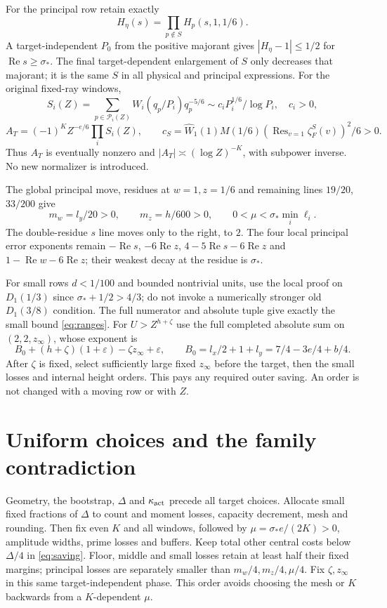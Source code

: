 \documentclass[11pt,a4paper]{article}
\theoremstyle{definition}
\newcommand{\Rea}{\operatorname{Re}}
\newcommand{\eps}{\varepsilon}
\newcommand{\sig}{\sigma_*}
\begin{document}
For the principal row retain exactly
\[
 H_\eta(s)=\prod_{p\notin S}H_p(s,1,1/6).
\]
A target-independent $P_0$ from the positive majorant gives
$|H_\eta-1|\le1/2$ for $\Rea s\ge\sig$.
The final target-dependent enlargement of $S$ only decreases
that majorant; it is the same $S$ in all physical and principal
expressions. For the original fixed-ray windows,
\[
 S_i(Z)=\sum_{p\in\mathcal P_i(Z)}
 W_i(q_p/P_i)q_p^{-5/6}\sim c_iP_i^{1/6}/\log P_i,\quad c_i>0,
\]
\[
 A_T=(-1)^K Z^{-e/6}\prod_i S_i(Z),\qquad
 c_S=\widehat W_1(1)M(1/6)
      (\operatorname{Res}_{v=1}\zeta_F^S(v))^2/6>0 .
\]
Thus $A_T$ is eventually nonzero and
$|A_T|\asymp(\log Z)^{-K}$, with subpower inverse.
No new normalizer is introduced.

The global principal move, residues at $w=1,z=1/6$ and
remaining lines $19/20$, $33/200$ give
\[
 m_w=l_y/20>0,\qquad m_z=h/600>0,\qquad
 0<\mu<\sig\min_i\ell_i .
\]
The double-residue $s$ line moves only to the right, to $2$.
The four local principal error exponents remain
$-\Rea s$, $-6\Rea z$, $4-5\Rea s-6\Rea z$ and
$1-\Rea w-6\Rea z$; their weakest decay at the residue is $\sig$.

For small rows $d<1/100$ and bounded nontrivial units, use
the local proof on $D_1(1/3)$ since $\sig+1/2>4/3$;
do not invoke a numerically stronger old $D_1(3/8)$ condition.
The full numerator and absolute tuple give exactly the
small bound \eqref{eq:ranges}.
For $U>Z^{h+\zeta}$ use the full completed absolute sum on
$(2,2,z_\infty)$, whose exponent is
\[
 B_0+(h+\zeta)(1+\eps)-\zeta z_\infty+\eps,\qquad
 B_0=l_x/2+1+l_y=7/4-3e/4+b/4.
\]
After $\zeta$ is fixed, select sufficiently large fixed
$z_\infty$ before the target, then the small losses and
internal height orders. This pays any required outer saving.
An order is not changed with a moving row or with $Z$.

\section{Uniform choices and the family contradiction}
\label{sec:continuation}
Geometry, the bootstrap, $\Delta$ and $\kappa_{\rm act}$ precede
all target choices. Allocate small fixed fractions of $\Delta$
to count and moment losses, capacity decrement, mesh and rounding.
Then fix even $K$ and all windows, followed by
$\mu=\sig e/(2K)>0$, amplitude widths, prime losses and buffers.
Keep total other central costs below $\Delta/4$ in
\eqref{eq:saving}. Floor, middle and small losses retain at
least half their fixed margins; principal losses are separately
smaller than $m_w/4,m_z/4,\mu/4$.
Fix $\zeta,z_\infty$ in this same target-independent phase.
This order avoids choosing the mesh or $K$ backwards from a
$K$-dependent $\mu$.
\end{document}
